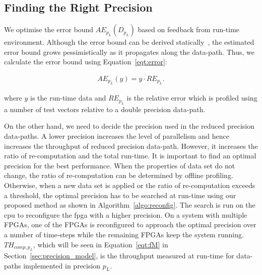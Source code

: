 \subsection{Finding the Right Precision}
\label{sec:precision_search}
We optimise the error bound $AE_{p_L}(D_{p_L})$ based on feedback from run-time environment.
Although the error bound can be derived statically~\cite{lee05},
the estimated error bound grows pessimistically as it propagates along the data-path.
Thus, we calculate the error bound using Equation~\ref{eqt:error}:

\begin{equation}
\begin{aligned}
AE_{p_L}(y) = y \cdot RE_{p_L} \mbox{.}
\end{aligned}
\label{eqt:error}
\end{equation}

where $y$ is the run-time data and $RE_{p_L}$ is the relative error which is profiled using a number of test vectors relative to a double precision data-path.

On the other hand, we need to decide the precision used in the reduced precision data-paths.
A lower precision increases the level of parallelism and hence increases the throughput of reduced precision data-path.
However, it increases the ratio of re-computation and the total run-time.
It is important to find an optimal precision for the best performance.
When the properties of data set do not change, the ratio of re-computation can be determined by offline profiling.
Otherwise, when a new data set is applied or the ratio of re-computation exceeds a threshold, the optimal precision has to be searched at run-time using our proposed method as shown in Algorithm~\ref{algo:reconfig}.
The search is run on the \gls{cpu} to reconfigure the \gls{fpga} with a higher precision.
On a system with multiple FPGAs, one of the FPGAs is reconfigured to approach the optimal precision over a number of time-steps
while the remaining FPGAs keep the system running.
$TH_{comp,p_L}$, which will be seen in Equation~\ref{eqt:fM} in Section~\ref{sec:precision_model}, is the throughput measured at run-time for data-paths implemented in precision $p_L$.

